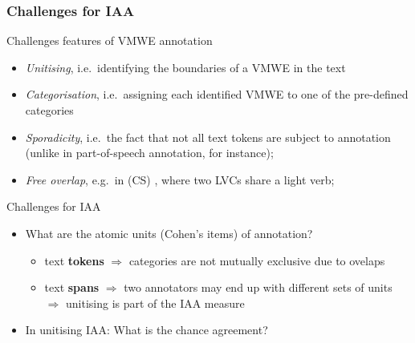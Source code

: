 \documentclass[xcolor=dvipsnames]{beamer}
\begin{document}
\begin{frame}[label={iaa}]
  \vspace*{-5pt}
  \frametitle{Challenges for IAA}

\begin{scriptsize}

\begin{block}{Challenges features of VMWE annotation}
\begin{itemize}
\item \emph{Unitising}, i.e.\ identifying the boundaries of a VMWE in the text
\item \emph{Categorisation}, i.e.\ assigning each identified VMWE to one of the pre-defined categories
\item \emph{Sporadicity}, i.e.\ the fact that not all text tokens are subject to annotation (unlike in part-of-speech annotation, for instance);
\item \emph{Free overlap}, e.g.\ in (CS) , where two LVCs share a light verb;
\end{itemize}
\end{block}

\begin{block}{Challenges for IAA}
\begin{itemize}
\item What are the atomic units (Cohen's items) of annotation?
   \begin{itemize}
   \item text \textbf{tokens} $\Rightarrow$ categories are not mutually exclusive due to ovelaps
   \item text \textbf{spans} $\Rightarrow$ two annotators may end up with different sets of units $\Rightarrow$ unitising is part of the IAA measure
   \end{itemize}
\item In unitising IAA: What is the chance agreement?
\end{itemize}
\end{block}

\end{scriptsize}

\end{frame}
\end{document}
